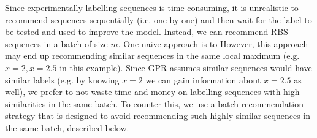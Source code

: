 Since experimentally labelling sequences is time-consuming, it is unrealistic to recommend sequences sequentially (i.e. one-by-one) and then wait for the label to be tested and used to improve the model.
Instead, we can recommend RBS sequences in a batch of size $m$.
One naive approach is to
However, this approach may end up recommending similar sequences in the same local maximum (e.g. $x = 2, x =2.5$ in this example). 
Since GPR assumes similar sequences would have similar labels (e.g. by knowing $x=2$ we can gain information about $x=2.5$ as well), we prefer to not waste time and money on labelling sequences with high similarities in the same batch.
To counter this, we use a batch recommendation strategy that is designed to avoid recommending such highly similar sequences in the same batch, described below. \\


